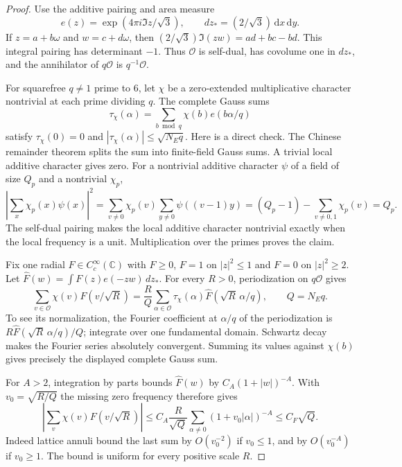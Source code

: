 \documentclass[11pt]{article}
\theoremstyle{remark}\newtheorem{remark}[theorem]{Remark}
\newcommand{\C}{\mathbb C}
\newcommand{\dd}{\,\mathrm d}
\begin{document}
\begin{proof}
Use the additive pairing and area measure
\[
 e(z)=\exp(4\pi i\Im z/\sqrt3),\qquad
 dz_*=(2/\sqrt3)\dd x\dd y.
\]
If $z=a+b\omega$ and $w=c+d\omega$, then
$(2/\sqrt3)\Im(zw)=ad+bc-bd$.
This integral pairing has determinant $-1$. Thus $\mathcal O$
is self-dual, has covolume one in $dz_*$, and the annihilator
of $q\mathcal O$ is $q^{-1}\mathcal O$.

For squarefree $q\ne1$ prime to $6$, let $\chi$ be a zero-extended
multiplicative character nontrivial at each prime dividing $q$.
The complete Gauss sums
\[
 \tau_\chi(\alpha)=\sum_{b\bmod q}\chi(b)e(b\alpha/q)
\]
satisfy $\tau_\chi(0)=0$ and $|\tau_\chi(\alpha)|\le\sqrt{N_Eq}$.
Here is a direct check. The Chinese remainder theorem splits
the sum into finite-field Gauss sums. A trivial local additive
character gives zero. For a nontrivial additive character $\psi$
of a field of size $Q_p$ and a nontrivial $\chi_p$,
\[
 \left|\sum_x\chi_p(x)\psi(x)\right|^2
 =\sum_{v\ne0}\chi_p(v)\sum_{y\ne0}\psi((v-1)y)
 =(Q_p-1)-\sum_{v\ne0,1}\chi_p(v)=Q_p.
\]
The self-dual pairing makes the local additive character
nontrivial exactly when the local frequency is a unit.
Multiplication over the primes proves the claim.

Fix one radial $F\in C_c^\infty(\C)$ with $F\ge0$,
$F=1$ on $|z|^2\le1$ and $F=0$ on $|z|^2\ge2$.
Let $\widehat F(w)=\int F(z)e(-zw)\,dz_*$.
For every $R>0$, periodization on $q\mathcal O$ gives
\[
 \sum_{v\in\mathcal O}\chi(v)F(v/\sqrt R)
 =\frac{R}{Q}\sum_{\alpha\in\mathcal O}
       \tau_\chi(\alpha)\widehat F(\sqrt R\,\alpha/q),
       \qquad Q=N_Eq.
\]
To see its normalization, the Fourier coefficient at $\alpha/q$
of the periodization is
$R\widehat F(\sqrt R\,\alpha/q)/Q$; integrate over one
fundamental domain. Schwartz decay makes the Fourier series
absolutely convergent. Summing its values against $\chi(b)$
gives precisely the displayed complete Gauss sum.

For $A>2$, integration by parts bounds $\widehat F(w)$ by
$C_A(1+|w|)^{-A}$. With $v_0=\sqrt{R/Q}$ the missing zero
frequency therefore gives
\[
 \left|\sum_v\chi(v)F(v/\sqrt R)\right|
 \le C_A\frac{R}{\sqrt Q}
     \sum_{\alpha\ne0}(1+v_0|\alpha|)^{-A}
 \le C_F\sqrt Q.
\]
Indeed lattice annuli bound the last sum by $O(v_0^{-2})$
if $v_0\le1$, and by $O(v_0^{-A})$ if $v_0\ge1$.
The bound is uniform for every positive scale $R$.


\end{proof}
\end{document}
